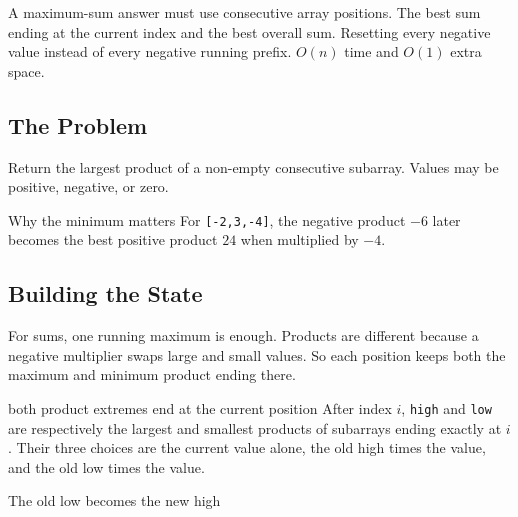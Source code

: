 \chaptercheckpoint
  {A maximum-sum answer must use consecutive array positions.}
  {The best sum ending at the current index and the best overall sum.}
  {Resetting every negative value instead of every negative running prefix.}
  {$O(n)$ time and $O(1)$ extra space.}



\subsection{The Problem}
Return the largest product of a non-empty consecutive subarray. Values may be
positive, negative, or zero.

\begin{conceptbox}{Why the minimum matters}
For \texttt{[-2,3,-4]}, the negative product \(-6\) later becomes the best
positive product \(24\) when multiplied by \(-4\).
\end{conceptbox}

\subsection{Building the State}
For sums, one running maximum is enough. Products are different because a
negative multiplier swaps large and small values. So each position
keeps both the maximum and minimum product ending there.

\begin{invariantbox}{both product extremes end at the current position}
After index \(i\), \texttt{high} and \texttt{low} are respectively the
largest and smallest products of subarrays ending exactly at \(i\). Their
three choices are the current value alone, the old high times the value,
and the old low times the value.
\end{invariantbox}

\begin{visualbox}{The old low becomes the new high}
\centering
{}
\end{visualbox}

